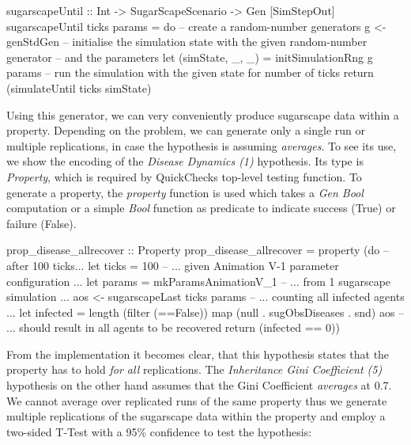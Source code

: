 \begin{HaskellCode}
sugarscapeUntil :: Int -> SugarScapeScenario -> Gen [SimStepOut]
sugarscapeUntil ticks params = do
  -- create a random-number generators
  g <- genStdGen
  -- initialise the simulation state with the given random-number generator
  -- and the parameters
  let (simState, _, _) = initSimulationRng g params
  -- run the simulation with the given state for number of ticks
  return (simulateUntil ticks simState)
\end{HaskellCode}

Using this generator, we can very conveniently produce sugarscape data within a property. Depending on the problem, we can generate only a single run or multiple replications, in case the hypothesis is assuming \textit{averages}. To see its use, we show the encoding of the \textit{Disease Dynamics (1)} hypothesis. Its type is \textit{Property}, which is required by QuickChecks top-level testing function. To generate a property, the \textit{property} function is used which takes a \textit{Gen Bool} computation or a simple \textit{Bool} function as predicate to indicate success (True) or failure (False).

\begin{HaskellCode}
prop_disease_allrecover :: Property
prop_disease_allrecover = property (do
  -- after 100 ticks...
  let ticks  = 100
  -- ... given Animation V-1 parameter configuration ...
  let params = mkParamsAnimationV_1
  -- ... from 1 sugarscape simulation ...
  aos <- sugarscapeLast ticks params
  -- ... counting all infected agents ...
  let infected = length (filter (==False)) map (null . sugObsDiseases . snd) aos
  -- ... should result in all agents to be recovered
  return (infected == 0))
\end{HaskellCode}

From the implementation it becomes clear, that this hypothesis states that the property has to hold \textit{for all} replications. The \textit{Inheritance Gini Coefficient (5)} hypothesis on the other hand assumes that the Gini Coefficient \textit{averages} at 0.7. We cannot average over replicated runs of the same property thus we generate multiple replications of the sugarscape data within the property and employ a two-sided T-Test with a 95\% confidence to test the hypothesis:

